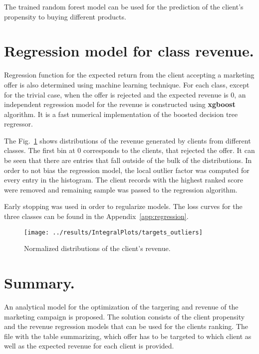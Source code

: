 \documentclass[14pt]{scrartcl}
\begin{document}
The trained random forest model can be used for the prediction of the client's 
propensity to buying different products. 

\section{Regression model for class revenue.}\label{sec:mva_regression}

Regression function for the expected return from the client accepting a marketing offer
is also determined using machine learning technique. For each class, except for the
trivial case, when the offer is rejected and the expected revenue is 0, an independent
regression model for the revenue is constructed using \textbf{xgboost} algorithm. It
is a fast numerical implementation of the boosted decision tree regressor.

The Fig.~\ref{fig:targets_outliers} shows distributions of the revenue generated
by clients from different classes. The first bin at 0 corresponds to the clients, that
rejected the offer. It can be seen that there are entries that fall outside of the bulk
of the distributions. In order to not bias the regression model, the local outlier
factor was computed for every entry in the histogram. The client records with the 
highest ranked score were removed and remaining sample was passed to the regression
algorithm.

Early stopping was used in order to regularize models. The loss curves for the
three classes can be found in the Appendix~\ref{app:regression}.

\begin{figure}[htpb!]
    \texttt{[image: ../results/IntegralPlots/targets\_outliers]}\\
    \caption{Normalized distributions of the client's revenue.}
    \label{fig:targets_outliers}
\end{figure}

\section{Summary.}
An analytical model for the optimization of the targering and revenue of the marketing
campaign is proposed. The solution consists of the client propensity and the revenue
regression models that can be used for the clients ranking. The file with the table
summarizing, which offer has to be targeted to which client as well as the expected 
revenue for each client is provided.
\end{document}

